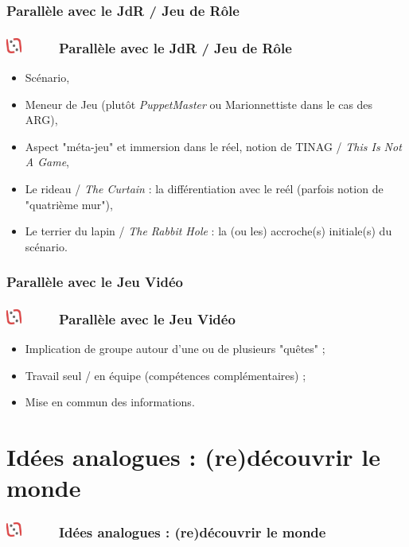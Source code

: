 \documentclass[slidetop,11pt]{beamer}
\def\moreInFrameTitleLeftt{\includegraphics[height=0.5cm]{img/ligueludique-0.png}~~~~~}
\begin{document}
\def\sectionPartIIcII{Parall{\`e}le avec le JdR / Jeu de R{\^o}le}
\subsubsection{\sectionPartIIcII} %
\begin{frame}
	\frametitle{\moreInFrameTitleLeftt \sectionPartIIcII }
	\begin{itemize}
		\item Sc{\'e}nario, 
		\item Meneur de Jeu (plut{\^o}t \emph{PuppetMaster} ou Marionnettiste dans le cas des ARG), 
		\item Aspect "m{\'e}ta-jeu" et immersion dans le r{\'e}el, notion de TINAG / \emph{This Is Not A Game}, 
		\item Le rideau / \emph{The Curtain} : la diff{\'e}rentiation avec le re{\'e}l (parfois notion de "quatri{\`e}me mur"), 
		\item Le terrier du lapin / \emph{The Rabbit Hole} : la (ou les) accroche(s) initiale(s) du sc{\'e}nario. 
	\end{itemize}
\end{frame} 

\def\sectionPartIIcIII{Parall{\`e}le avec le Jeu Vid{\'e}o}
\subsubsection{\sectionPartIIcIII} %
\begin{frame}
	\frametitle{\moreInFrameTitleLeftt \sectionPartIIcIII }
	\begin{itemize}
		\item Implication de groupe autour d'une ou de plusieurs "qu{\^e}tes" ; 
		\item Travail seul / en {\'e}quipe (comp{\'e}tences compl{\'e}mentaires) ; 
		\item Mise en commun des informations. 
	\end{itemize}
\end{frame} 


\def\sectionPartIII{Id{\'e}es analogues : (re)d{\'e}couvrir le monde}
\section{\sectionPartIII}
\begin{frame}
	\frametitle{\moreInFrameTitleLeftt \sectionPartIII}
	\tableofcontents[sections=3,currentsection,subsectionstyle=show/shaded/hide] %
\end{frame} 
\end{document}

